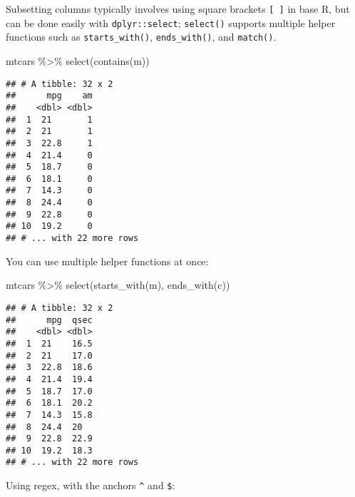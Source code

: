 \documentclass[
]{book}
\newenvironment{Shaded}{\begin{snugshade}}{\end{snugshade}}
\newcommand{\FunctionTok}[1]{\textcolor[rgb]{0.00,0.00,0.00}{#1}}
\newcommand{\NormalTok}[1]{#1}
\newcommand{\SpecialCharTok}[1]{\textcolor[rgb]{0.00,0.00,0.00}{#1}}
\newcommand{\StringTok}[1]{\textcolor[rgb]{0.31,0.60,0.02}{#1}}
\begin{document}
Subsetting columns typically involves using square brackets \texttt{{[}\ {]}} in base R, but can be done easily with \texttt{dplyr::select}; \texttt{select()} supports multiple helper functions such as \texttt{starts\_with()}, \texttt{ends\_with()}, and \texttt{match()}.

\begin{Shaded}
\begin{Highlighting}[]
\NormalTok{mtcars }\SpecialCharTok{\%\textgreater{}\%} \FunctionTok{select}\NormalTok{(}\FunctionTok{contains}\NormalTok{(}\StringTok{\textquotesingle{}m\textquotesingle{}}\NormalTok{))}
\end{Highlighting}
\end{Shaded}

\begin{verbatim}
## # A tibble: 32 x 2
##      mpg    am
##    <dbl> <dbl>
##  1  21       1
##  2  21       1
##  3  22.8     1
##  4  21.4     0
##  5  18.7     0
##  6  18.1     0
##  7  14.3     0
##  8  24.4     0
##  9  22.8     0
## 10  19.2     0
## # ... with 22 more rows
\end{verbatim}

You can use multiple helper functions at once:

\begin{Shaded}
\begin{Highlighting}[]
\NormalTok{mtcars }\SpecialCharTok{\%\textgreater{}\%} \FunctionTok{select}\NormalTok{(}\FunctionTok{starts\_with}\NormalTok{(}\StringTok{\textquotesingle{}m\textquotesingle{}}\NormalTok{), }\FunctionTok{ends\_with}\NormalTok{(}\StringTok{\textquotesingle{}c\textquotesingle{}}\NormalTok{))}
\end{Highlighting}
\end{Shaded}

\begin{verbatim}
## # A tibble: 32 x 2
##      mpg  qsec
##    <dbl> <dbl>
##  1  21    16.5
##  2  21    17.0
##  3  22.8  18.6
##  4  21.4  19.4
##  5  18.7  17.0
##  6  18.1  20.2
##  7  14.3  15.8
##  8  24.4  20  
##  9  22.8  22.9
## 10  19.2  18.3
## # ... with 22 more rows
\end{verbatim}

Using regex, with the anchors \texttt{\^{}} and \texttt{\$}:

\begin{Shaded}
\end{Shaded}
\end{document}
